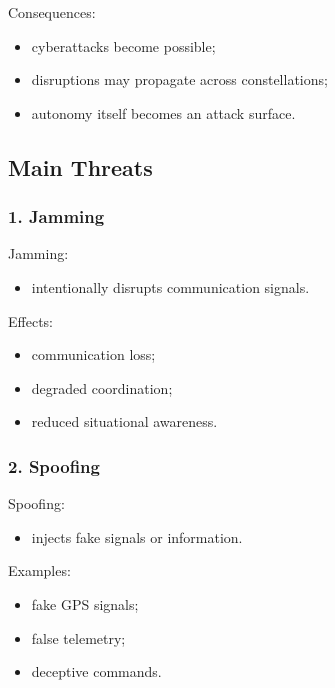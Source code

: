 \documentclass[10pt,a4paper,twocolumn]{article}
\begin{document}
Consequences:
\begin{itemize}
    \item cyberattacks become possible;
    \item disruptions may propagate across constellations;
    \item autonomy itself becomes an attack surface.
\end{itemize}


\subsection{Main Threats}


\subsubsection*{1. Jamming}

Jamming:
\begin{itemize}
    \item intentionally disrupts communication signals.
\end{itemize}

Effects:
\begin{itemize}
    \item communication loss;
    \item degraded coordination;
    \item reduced situational awareness.
\end{itemize}


\subsubsection*{2. Spoofing}

Spoofing:
\begin{itemize}
    \item injects fake signals or information.
\end{itemize}

Examples:
\begin{itemize}
    \item fake GPS signals;
    \item false telemetry;
    \item deceptive commands.
\end{itemize}
\end{document}
